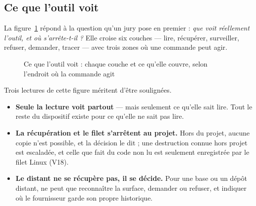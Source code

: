 \subsection{Ce que l'outil voit}
\label{sec:vision}
La figure~\ref{fig:vision} répond à la question qu'un jury pose en premier : \emph{que
voit réellement l'outil, et où s'arrête-t-il ?} Elle croise six couches --- lire,
récupérer, surveiller, refuser, demander, tracer --- avec trois zones où une commande peut
agir.

\begin{figure}[htbp]
\centering

\caption{Ce que l'outil voit : chaque couche et ce qu'elle couvre, selon l'endroit où la commande agit}
\label{fig:vision}
\end{figure}

Trois lectures de cette figure méritent d'être soulignées.
\begin{itemize}
  \item \textbf{Seule la lecture voit partout} --- mais seulement ce qu'elle sait lire. Tout
    le reste du dispositif existe pour ce qu'elle ne sait pas lire.
  \item \textbf{La récupération et le filet s'arrêtent au projet.} Hors du projet, aucune copie
    n'est possible, et la décision le dit ; une destruction connue hors projet est escaladée, et
    celle que fait du code non lu est seulement enregistrée par le filet Linux (V18).
  \item \textbf{Le distant ne se récupère pas, il se décide.} Pour une base ou un dépôt
    distant, \demo{} ne peut que reconnaître la surface, demander ou refuser, et indiquer où
    le fournisseur garde son propre historique.
\end{itemize}
